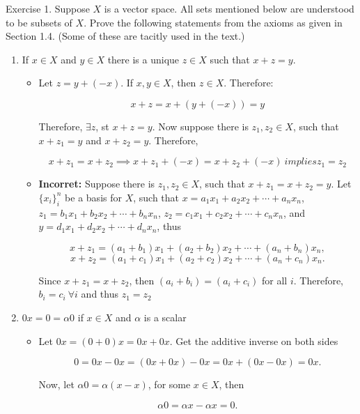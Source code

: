 Exercise 1. Suppose $X$ is a vector space. All sets mentioned below are understood to be subsets of $X$. Prove the following statements from the axioms as given in Section 1.4. (Some of these are tacitly used in the text.)

\begin{enumerate}[label=(\alph*)]
    \item If $x \in X$ and $y\in X$ there is a unique $z\in X$ such that $x+z=y$.
          \begin{itemize}
              \item Let $z=y+(-x)$. If $x,y\in X$, then $z\in X$. Therefore:

                    $$x+z=x+(y+(-x))=y$$

                    Therefore, $\exists z$, st $x+z=y$. Now suppose there is $z_1,z_2 \in X$, such that $x+z_1=y$ and $x+z_2=y$. Therefore,

                    $$x+z_1=x+z_2 \implies x+z_1+(-x)=x+z_2+(-x) \ implies z_1=z_2$$


              \item \textbf{Incorret:} Suppose there is $z_1,z_2 \in X$, such that $x+z_1=x+z_2=y$. Let $\{x_i\}_i^n$ be a basis for $X$, such that $x=a_1x_1+a_2x_2+\cdots+a_nx_n$, $z_1=b_1x_1+b_2x_2+\cdots+b_nx_n$, $z_2=c_1x_1+c_2x_2+\cdots+c_nx_n$, and $y=d_1x_1+d_2x_2+\cdots+d_nx_n$, thus

                    $$x+z_1=(a_1+b_1)x_1+(a_2+b_2)x_2+\cdots+(a_n+b_n)x_n,$$
                    $$x+z_2=(a_1+c_1)x_1+(a_2+c_2)x_2+\cdots+(a_n+c_n)x_n.$$

                    Since $x+z_1=x+z_2$, then $(a_i+b_i)=(a_i+c_i)$ for all $i$. Therefore, $b_i=c_i \ \forall i$ and thus $z_1=z_2$

          \end{itemize}

    \item $0x=0=\alpha 0$ if $x\in X$ and $\alpha$ is a scalar
          \begin{itemize}
              \item Let $0x=(0+0)x = 0x + 0x$. Get the additive inverse on both sides

                    $$
                        0=0x-0x = (0x + 0x) -0x=0x+(0x-0x)=0x.
                    $$

                    Now, let $\alpha 0 = \alpha(x-x)$, for some $x\in X$, then

                    $$\alpha 0=\alpha x-\alpha x=0.$$


\end{itemize}
\end{enumerate}
